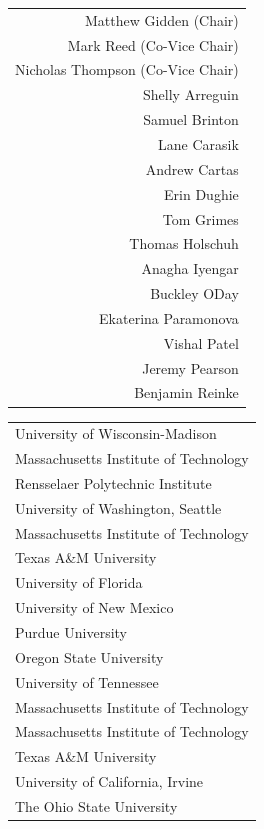 \begin{large}
\begin{minipage}[b]{0.45\linewidth}
\centering
\begin{tabular}{r}
Matthew Gidden (Chair)\\
Mark Reed (Co-Vice Chair)\\
Nicholas Thompson (Co-Vice Chair)\\ 
Shelly Arreguin\\
Samuel Brinton\\
Lane Carasik\\
Andrew Cartas \\
Erin Dughie\\
Tom Grimes\\
Thomas Holschuh\\
Anagha Iyengar\\
Buckley ODay\\
Ekaterina Paramonova\\
Vishal Patel\\
Jeremy Pearson\\
Benjamin Reinke\\
\end{tabular}
\end{minipage}
\hspace{1cm}
\begin{minipage}[b]{0.45\linewidth}
\centering
\begin{tabular}{l}
University of Wisconsin-Madison\\
Massachusetts Institute of Technology\\
Rensselaer Polytechnic Institute\\
University of Washington, Seattle\\
Massachusetts Institute of Technology\\
Texas A\&M University\\
University of Florida\\
University of New Mexico\\
Purdue University\\
Oregon State University\\
University of Tennessee\\
Massachusetts Institute of Technology\\
Massachusetts Institute of Technology\\
Texas A\&M University\\
University of California, Irvine\\
The Ohio State University\\
\end{tabular}
\end{minipage}
\end{large}
\thispagestyle{empty}
